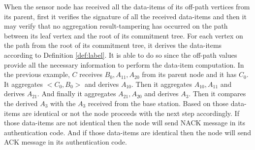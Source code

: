 		When the sensor node has received all the data-items of its off-path vertices from its parent, first it verifies the signature of all the received data-items and then it may verify that no aggregation result-tampering has occurred on the path between its leaf vertex and the root of its commitment tree.
		For each vertex on the path from the root of its commitment tree, it derives the data-items according to Definition \ref{def:label}.
		It is able to do so since the off-path values provide all the necessary information to perform the data-item computation.
		In the previous example, $C$ receives $B_{0}, A_{11}, A_{20}$ from its parent node and it has $C_{0}$.
		It aggregates $<C_{0}, B_{0}>$ and derives $A_{10}$.
		Then it aggregates $A_{10}, A_{11}$ and derives $A_{21}$.
		And finally it aggregates $A_{21}, A_{20}$ and derives $A_{3}$.
		Then it compares the derived $A_{3}$ with the $A_{3}$ received from the base station.
		Based on those data-items are identical or not the node proceeds with the next step accordingly.
		If those data-items are not identical then the node will send NACK message in its authentication code.
		And if those data-items are identical then the node will send ACK message in its authentication code.	

